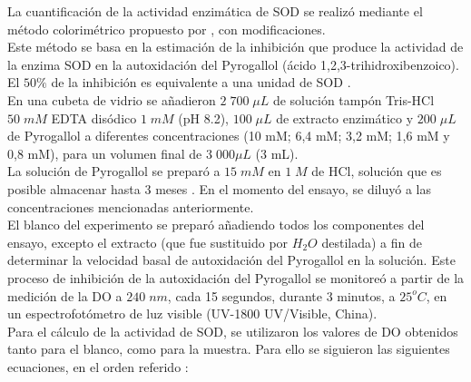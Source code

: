 La cuantificaci\'on de la actividad enzim\'atica de SOD se realiz\'o mediante el m\'etodo colorim\'etrico propuesto por \cite{ma2009spectroscopic}, con modificaciones.\\ 

Este m\'etodo se basa en la estimaci\'on de la inhibici\'on que produce la actividad de la enzima SOD en la autoxidaci\'on del Pyrogallol (\'acido 1,2,3-trihidroxibenzoico). El $50\%$ de la inhibici\'on es equivalente a una unidad de SOD  \citep{pandey2014oxidative}. \\

En una cubeta de vidrio se a\~nadieron $2\;700\;\mu L$ de soluci\'on tamp\'on Tris-HCl $50\;mM$ EDTA dis\'odico $1\;mM$ (pH 8.2), $100\;{\mu}L$ de extracto enzim\'atico y $200\;{\mu}L$ de Pyrogallol a diferentes concentraciones (10 mM; 6,4 mM; 3,2 mM; 1,6 mM y 0,8 mM), para un volumen final de $3\;000{\mu}L$ (3 mL). \\

La soluci\'on de Pyrogallol se prepar\'o a $15\;mM$ en $1\;M$ de HCl, solución que es posible almacenar hasta 3 meses \citep{masayasu1979simplified}. En el momento del ensayo, se diluyó a las concentraciones mencionadas anteriormente. \\

El blanco del experimento se prepar\'o a\~nadiendo todos los componentes del ensayo, excepto el extracto (que fue sustituido por $H_2O$ destilada) a fin de determinar la velocidad basal de autoxidación del Pyrogallol en la soluci\'on. Este proceso de inhibici\'on de la autoxidaci\'on del Pyrogallol se monitore\'o a partir de la medici\'on de la DO a $240\;nm$, cada 15 segundos, durante 3 minutos, a $25^oC$, en un espectrofotómetro de luz visible (UV-1800 UV/Visible, China). \\


Para el c\'alculo de la actividad de SOD, se utilizaron los valores de DO obtenidos tanto para el blanco, como para la muestra. Para ello se siguieron las siguientes ecuaciones, en el orden referido \citep{pandey2014oxidative}:

